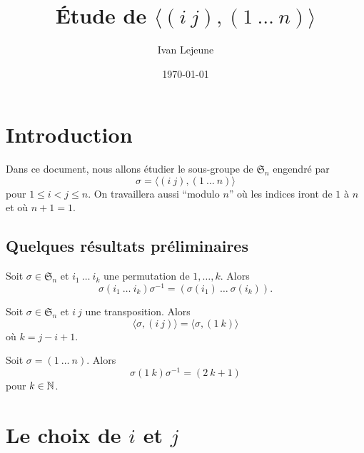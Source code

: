\documentclass[french,a4paper,10pt]{article}
\title{\color{astral} \sffamily \bfseries Étude de \( \langle (i~j),(1~\ldots~n) \rangle \)}
\author{Ivan Lejeune}
\date{\today}
\begin{document}
    \maketitle

    \section*{Introduction}

    Dans ce document, nous allons étudier le sous-groupe de \( \mathfrak S_n \) engendré par
    \begin{equation*}
        \sigma = \langle (i~j),(1~\ldots~n) \rangle
    \end{equation*}
    pour \( 1 \leq i < j \leq n \). On travaillera aussi ``modulo \(n\)'' 
    où les indices iront de \(1\) à \(n\) et où \(n+1 = 1\).

    \subsection*{Quelques résultats préliminaires}

    \begin{lemma}
        Soit \( \sigma \in \mathfrak S_n \) et \( i_1~\ldots~i_k \) une permutation de \( 1, \ldots, k \). Alors
        \begin{equation*}
            \sigma (i_1~\ldots~i_k) \sigma^{-1} = (\sigma(i_1)~\ldots~\sigma(i_k)).
        \end{equation*}
    \end{lemma}

    \begin{lemma}
        Soit \( \sigma \in \mathfrak S_n \) et \( i~j \) une transposition. Alors
        \begin{equation*}
            \langle \sigma, (i~j) \rangle = \langle \sigma, (1~k) \rangle
        \end{equation*}
        où \( k = j - i + 1 \).
    \end{lemma}

    \begin{lemma}
        Soit \( \sigma = (1~\ldots~n) \). Alors
        \begin{equation*}
            \sigma (1~k) \sigma^{-1} = (2~k+1)
        \end{equation*}
        pour \( k \in \mathbb{N} \).
    \end{lemma}

    \section*{Le choix de \(i\) et \(j\)}
\end{document}

